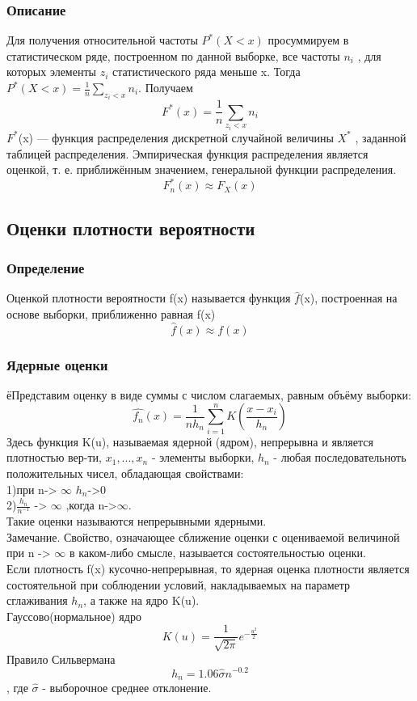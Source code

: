 \documentclass[a4]{article}
\begin{document}
			\subsubsection{Описание}
				Для получения относительной частоты $P^*(X<x)$ просуммируем в статистическом ряде, построенном по данной выборке, все частоты $n_i$ , для
				которых элементы $z_i$ статистического ряда меньше x. Тогда $P^*(X<x) = \frac{1}{n}\sum_{z_i<x}n_i $. Получаем\\
				$$F^*(x) = \frac{1}{n}\sum_{z_i<x}n_i$$
				$F^*$(x) — функция распределения дискретной случайной величины $X^*$
				, заданной таблицей распределения.
				Эмпирическая функция распределения является оценкой, т. е. приближённым значением, генеральной функции распределения.
				$$F^*_n(x) \approx F_X(x)$$
				
		\subsection{Оценки плотности вероятности}
			\subsubsection{Определение}
				Оценкой плотности вероятности f(x) называется функция $\hat{f}$(x), построенная на основе выборки, приближенно равная f(x) $$\hat{f}(x) \approx f(x)$$
			\subsubsection{Ядерные оценки}
			ёПредставим оценку в виде суммы с числом слагаемых, равным объёму выборки: 
			$$\hat{f_n}(x) = \frac{1}{n h_n} \sum_{i = 1}^{n} K(\frac{x - x_i}{h_n})$$
			Здесь функция K(u), называемая ядерной (ядром), непрерывна и является плотностью вер-ти, $x_1, ..., x_n$ - элементы выборки, {$h_n$} - любая последовательноть положительных чисел, обладающая свойствами:\\
			1)при n-> $\infty$ $h_n$->0\\
			2)$\frac{h_n}{n^{-1}}$ -> $\infty$ ,когда n->$\infty$.\\
			Такие оценки называются непрерывными ядерными.\\
			
			Замечание. Свойство, означающее сближение оценки с оцениваемой величиной при n -> $\infty$ в каком-либо смысле, называется состоятельностью оценки.\\
			Если плотность f(x) кусочно-непрерывная, то ядерная оценка плотности
			является состоятельной при соблюдении условий, накладываемых на параметр сглаживания $h_n$, а также на ядро K(u).\\
			Гауссово(нормальное) ядро$$K(u) = \frac{1}{\sqrt{2 \pi}} e^{-\frac{u^2}{2}}$$
			Правило Сильвермана
			 $$h_n = 1.06 \hat{\sigma} n^{-0.2}$$, где $\hat{\sigma}$ - выборочное среднее отклонение.
		
\end{document}
